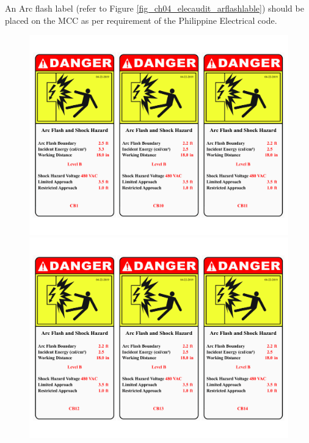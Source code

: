An Arc flash label (refer to Figure \ref{fig_ch04_elecaudit_arflashlable}) should be placed on the MCC as per requirement of the Philippine Electrical code.

\begin{figure}
	\begin{minipage}[b]{0.5\linewidth}
	\centering
	\includegraphics[width=\textwidth]{figures/R1P_systemdesign/fig_ch04_elecaudit_arflashlable01}
\end{minipage}
\hspace{0.03cm}
\begin{minipage}[b]{0.5\linewidth}
	\centering
	\includegraphics[width=\textwidth]{figures/R1P_systemdesign/fig_ch04_elecaudit_arflashlable02}

\end{minipage}
\end{figure}
